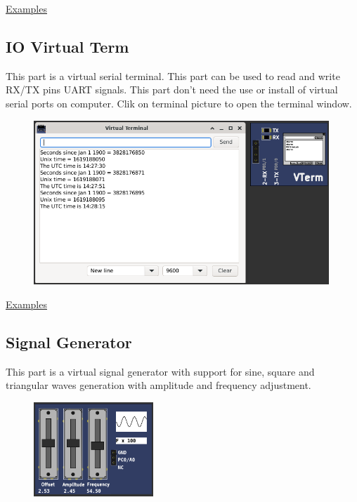 \href{https://lcgamboa.github.io/picsimlab_examples/examples/examples_index.html\#D.\_Transfer\_function}{Examples}

\subsection{IO Virtual Term}

This part is a virtual serial terminal. This part can be used to read and write RX/TX pins UART signals.
This part don't need the use or install of virtual serial ports on computer.  
Clik on terminal picture to open the terminal window.

\begin{figure}[H]
\center
\includegraphics[width=0.99\textwidth]{img/part_vterm.png} 
\end{figure} 

\href{https://lcgamboa.github.io/picsimlab_examples/examples/examples_index.html\#IO\_Virtual\_term}{Examples}

\subsection{Signal Generator}

This part is a virtual signal generator with support for sine, square and triangular waves 
generation with amplitude and frequency adjustment.

\begin{figure}[H]
\center
\includegraphics[width=0.4\textwidth]{img/part_sgen.png} 
\end{figure}

